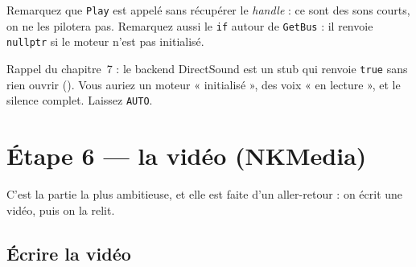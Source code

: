 Remarquez que \texttt{Play} est appelé sans récupérer le \emph{handle} : ce sont
des sons courts, on ne les pilotera pas. Remarquez aussi le \texttt{if} autour de
\texttt{GetBus} : il renvoie \texttt{nullptr} si le moteur n'est pas initialisé.

\begin{nkpiege}[N'écrivez jamais \texttt{cfg.backend = DIRECTSOUND}]
Rappel du chapitre~7 : le backend DirectSound est un stub qui renvoie
\texttt{true} sans rien ouvrir
(). Vous
auriez un moteur « initialisé », des voix « en lecture », et le silence complet.
Laissez \texttt{AUTO}.
\end{nkpiege}

\section{Étape 6 — la vidéo (NKMedia)}

C'est la partie la plus ambitieuse, et elle est faite d'un aller-retour : on
écrit une vidéo, puis on la relit.

\subsection{Écrire la vidéo}

